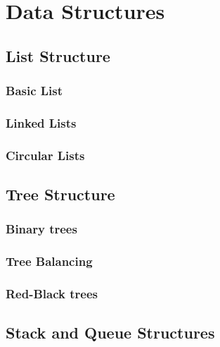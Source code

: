 \section{Data Structures}

\subsection{List Structure}

\subsubsection{Basic List}

\subsubsection{Linked Lists}

\subsubsection{Circular Lists}

\subsection{Tree Structure}

\subsubsection{Binary trees}

\subsubsection{Tree Balancing}

\subsubsection{Red-Black trees}

\subsection{Stack and Queue Structures}

